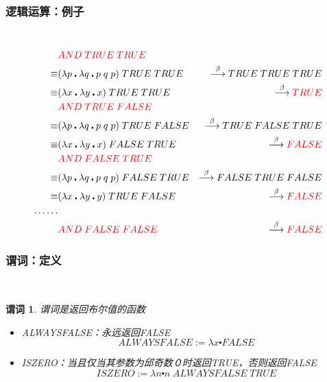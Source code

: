 \documentclass[CJKutf8,compress,hyperref]{beamer}
\begin{document}
\begin{CJK}{UTF8}{song}
\begin{frame}
  \frametitle{逻辑运算：例子}　
  \begin{eqnarray*}
 & {\color{red}AND \; TRUE \; TRUE} & \\ 
   \equiv & (\lambda p \centerdot \lambda q \centerdot p \; q \; p) \; TRUE \; TRUE & \stackrel{\beta}{\longrightarrow} TRUE \; TRUE \; TRUE \\ 
   \equiv & (\lambda x \centerdot \lambda y \centerdot x) \; TRUE \; TRUE & \stackrel{\beta}{\longrightarrow} {\color{red}TRUE} \\ 
     & {\color{red}AND \; TRUE \; FALSE} & \\ 
   \equiv & (\lambda p \centerdot \lambda q \centerdot p \; q \; p) \; TRUE \; FALSE & \stackrel{\beta}{\longrightarrow} TRUE \; FALSE \; TRUE \\ 
   \equiv & (\lambda x \centerdot \lambda y \centerdot x) \; FALSE \; TRUE & \stackrel{\beta}{\longrightarrow} {\color{red}FALSE} \\ 
     & {\color{red}AND \; FALSE \; TRUE} & \\ 
   \equiv & (\lambda p \centerdot \lambda q \centerdot p \; q \; p) \; FALSE \; TRUE & \stackrel{\beta}{\longrightarrow} FALSE \; TRUE \; FALSE \\ 
   \equiv & (\lambda x \centerdot \lambda y \centerdot y) \; TRUE \; FALSE & \stackrel{\beta}{\longrightarrow} {\color{red}FALSE} \\ 
\dots \dots  \\ 
     & {\color{red}AND \; FALSE \; FALSE} & \stackrel{\beta}{\longrightarrow} {\color{red}FALSE} \\ 
  \end{eqnarray*}
\end{frame}

\begin{frame}
  \frametitle{谓词：定义}　
\newtheorem{predF}{谓词} 
\begin{predF}
  谓词是返回布尔值的函数 
  \begin{itemize}
  \item ALWAYSFALSE：永远返回FALSE 
    \begin{displaymath}
      ALWAYSFALSE := \lambda x \centerdot FALSE 
    \end{displaymath}
  \item ISZERO：当且仅当其参数为邱奇数０时返回TRUE，否则返回FALSE
    \begin{displaymath}
       ISZERO := \lambda n \centerdot n \; ALWAYSFALSE \; TRUE
    \end{displaymath}
  \end{itemize}
\end{predF}
\end{frame}


\end{CJK}
\end{document}
